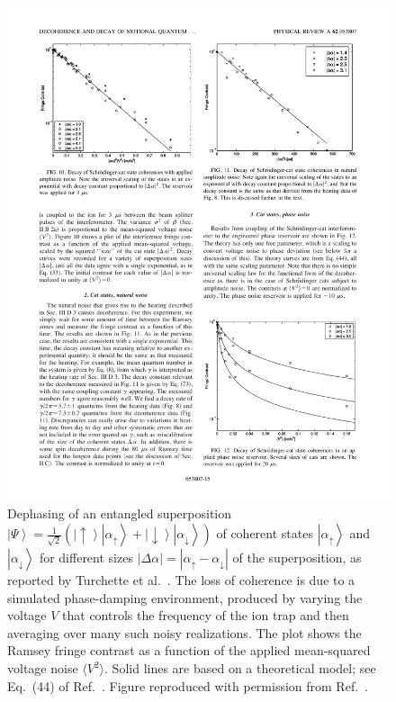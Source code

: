 \documentclass[3p,sort&compress,12pt]{elsarticle}
\newcommand{\ket}[1]{\left\vert{#1}\right\rangle}
\providecommand{\abs}[1]{\left\lvert#1\right\rvert}
\begin{document}
\begin{figure}
\centering
\includegraphics[scale=0.98]{turch.pdf} 
\caption{Dephasing of an entangled superposition $\ket{\Psi} = \frac{1}{\sqrt{2}} \left( \ket{\uparrow}\ket{\alpha_\uparrow} + \ket{\downarrow} \ket{\alpha_\downarrow} \right)$ of coherent states $\ket{\alpha_\uparrow}$ and $\ket{\alpha_\downarrow}$ for different sizes $\abs{\Delta \alpha} = \abs{\alpha_\uparrow-\alpha_\downarrow}$ of the superposition, as reported by Turchette et al.\ \cite{Turchette:2000:aa}. The loss of coherence is due to a simulated phase-damping environment, produced by varying the voltage $V$ that controls the frequency of the ion trap and then averaging over many such noisy realizations. The plot shows the Ramsey fringe contrast as a function of the applied mean-squared voltage noise $\langle V^2 \rangle$. Solid lines are based on a theoretical model; see Eq.~(44) of Ref.~\cite{Turchette:2000:aa}.  Figure reproduced with permission from Ref.~\cite{Turchette:2000:aa}.}
\label{fig:iondec2}
\end{figure}
 
\end{document}
